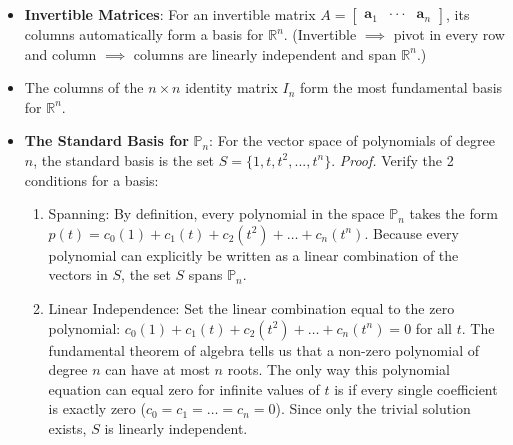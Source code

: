 \documentclass[../linear-algebra.tex]{subfiles}
\begin{document}
\begin{itemize}
    \item \textbf{Invertible Matrices}: For an invertible matrix $A=[\begin{matrix}\mathbf{a}_{1}&\cdot\cdot\cdot&\mathbf{a}_{n}\end{matrix}]$, its columns automatically form a basis for $\mathbb{R}^{n}$. (Invertible $\implies$ pivot in every row and column $\implies$ columns are linearly independent and span $\mathbb{R}^{n}$.)
    \item The columns of the $n\times n$ identity matrix $I_{n}$ form the most fundamental basis for $\mathbb{R}^{n}$. 
    \item \textbf{The Standard Basis for} $\mathbb{P}_{n}$: For the vector space of polynomials of degree $n$, the standard basis is the set $S=\{1,t,t^{2},...,t^{n}\}$.\newline
    \textit{Proof.} Verify the 2 conditions for a basis:
    \begin{enumerate}
        \item Spanning: By definition, every polynomial in the space $\mathbb{P}_{n}$ takes the form $p(t) = c_{0}(1) + c_{1}(t) + c_{2}(t^{2}) + \dots + c_{n}(t^{n})$. Because every polynomial can explicitly be written as a linear combination of the vectors in $S$, the set $S$ spans $\mathbb{P}_{n}$.
        \item Linear Independence: Set the linear combination equal to the zero polynomial: $c_{0}(1) + c_{1}(t) + c_{2}(t^{2}) + \dots + c_{n}(t^{n}) = 0$ for all $t$. The fundamental theorem of algebra tells us that a non-zero polynomial of degree $n$ can have at most $n$ roots. The only way this polynomial equation can equal zero for infinite values of $t$ is if every single coefficient is exactly zero ($c_{0} = c_{1} = \dots = c_{n} = 0$).
        Since only the trivial solution exists, $S$ is linearly independent.
    \end{enumerate}
\end{itemize}
\end{document}
